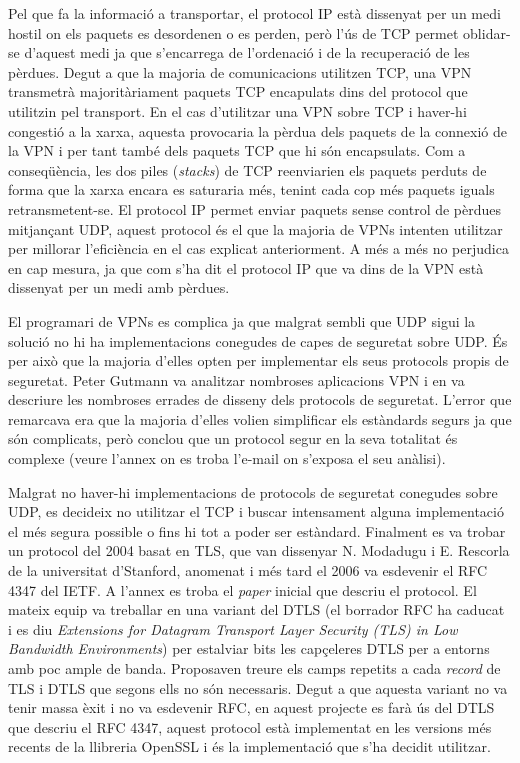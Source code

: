 Pel que fa la informació a transportar, el protocol IP està dissenyat per un medi hostil on els paquets es desordenen o es perden, però l'ús de TCP permet oblidar-se d'aquest medi ja que s'encarrega de l'ordenació i de la recuperació de les pèrdues. Degut a que la majoria de comunicacions utilitzen TCP, una VPN transmetrà majoritàriament paquets TCP encapulats dins del protocol que utilitzin pel transport.
En el cas d'utilitzar una VPN sobre TCP i haver-hi congestió a la xarxa, aquesta provocaria la pèrdua dels paquets de la connexió de la VPN i per tant també dels paquets TCP que hi són encapsulats. Com a conseqüència, les dos piles (\emph{stacks}) de TCP reenviarien els paquets perduts de forma que la xarxa encara es saturaria més, tenint cada cop més paquets iguals retransmetent-se.
El protocol IP permet enviar paquets sense control de pèrdues mitjançant UDP, aquest protocol és el que la majoria de VPNs intenten utilitzar per millorar l'eficiència en el cas explicat anteriorment. A més a més no  perjudica en cap mesura, ja que com s'ha dit el protocol IP que va dins de la VPN està dissenyat per un medi amb pèrdues.

El programari de VPNs es complica ja que malgrat sembli que UDP sigui la solució no hi ha implementacions conegudes de capes de seguretat sobre UDP. És per això que la majoria d'elles opten per implementar els seus protocols propis de seguretat.
Peter Gutmann va analitzar nombroses aplicacions VPN i en va descriure les nombroses errades de disseny dels protocols de seguretat. L'error que remarcava era que la majoria d'elles volien simplificar els estàndards segurs ja que són complicats, però conclou que un protocol segur en la seva totalitat és complexe (veure l'annex  on es troba l'e-mail on s'exposa el seu anàlisi).

Malgrat no haver-hi implementacions de protocols de seguretat conegudes sobre UDP, es decideix no utilitzar el TCP i buscar intensament alguna implementació el més segura possible o fins hi tot a poder ser estàndard. Finalment es va trobar un protocol del 2004 basat en TLS, que van dissenyar N. Modadugu i E. Rescorla de la universitat d'Stanford, anomenat  i més tard el 2006 va esdevenir el RFC 4347 del IETF. A l'annex  es troba el \emph{paper} inicial que descriu el protocol. El mateix equip va treballar en una variant del DTLS (el borrador RFC ha caducat i es diu \emph{Extensions for Datagram Transport Layer Security (TLS) in Low Bandwidth Environments}) per estalviar bits les capçeleres DTLS per a entorns amb poc ample de banda. Proposaven treure els camps repetits a cada \emph{record} de TLS i DTLS que segons ells no són necessaris. Degut a que aquesta variant no va tenir massa èxit i no va esdevenir RFC, en aquest projecte es farà ús del DTLS que descriu el RFC 4347, aquest protocol està implementat en les versions més recents de la llibreria OpenSSL i és la implementació que s'ha decidit utilitzar.

